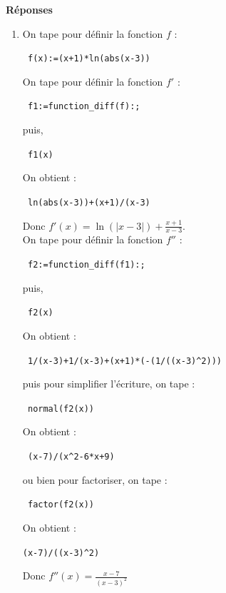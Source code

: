 \documentclass{article}
\begin{document}
\begin{giacjshere}
{\bf R\'eponses}
\begin{enumerate}
\item 
On tape pour d\'efinir la fonction $f$ :
\begin{center}
\verb| f(x):=(x+1)*ln(abs(x-3))|
\end{center}
On tape pour d\'efinir la fonction $f'$ :
\begin{center}
\verb| f1:=function_diff(f):;|
\end{center}
puis,
\begin{center}
\verb| f1(x)|
\end{center}
On obtient :
\begin{center}
\verb| ln(abs(x-3))+(x+1)/(x-3)|
\end{center}
Donc $\displaystyle f'(x)=\ln(|x-3|)+\frac{x+1}{x-3}$.\\
On tape  pour d\'efinir la fonction $f''$ :
\begin{center}
\verb| f2:=function_diff(f1):;|
\end{center}
puis,
\begin{center}
\verb| f2(x)|
\end{center}
On obtient :
\begin{center}
\verb| 1/(x-3)+1/(x-3)+(x+1)*(-(1/((x-3)^2)))|
\end{center}
puis pour simplifier l'\'ecriture, on tape :
\begin{center}
\verb| normal(f2(x))|
\end{center}
On obtient :
\begin{center}
\verb| (x-7)/(x^2-6*x+9)|
\end{center}
ou bien pour factoriser, on tape : 
\begin{center}
\verb| factor(f2(x))|
\end{center}
On obtient :
\begin{center}
\verb|(x-7)/((x-3)^2)|
\end{center}
Donc $\displaystyle f''(x)= \frac{x-7}{(x-3)^2}$


\end{enumerate}
\end{giacjshere}
\end{document}
